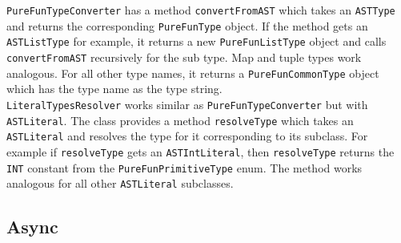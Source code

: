 \texttt{PureFunTypeConverter} has a method \texttt{convertFromAST} which takes an \texttt{ASTType} and returns the corresponding \texttt{PureFunType} object. If the method gets an \texttt{ASTListType} for example, it returns a new \texttt{PureFunListType} object and calls \texttt{convertFromAST} recursively for the sub type. Map and tuple types work analogous. For all other type names, it returns a \texttt{PureFunCommonType} object which has the type name as the type string.\\
\texttt{LiteralTypesResolver} works similar as \texttt{PureFunTypeConverter} but with \texttt{ASTLiteral}. The class provides a method \texttt{resolveType} which takes an \texttt{ASTLiteral} and resolves the type for it corresponding to its subclass. For example if \texttt{resolveType} gets an \texttt{ASTIntLiteral}, then \texttt{resolveType} returns the \texttt{INT} constant from the \texttt{PureFunPrimitiveType} enum. The method works analogous for all other \texttt{ASTLiteral} subclasses.\\

\subsection{Async}
